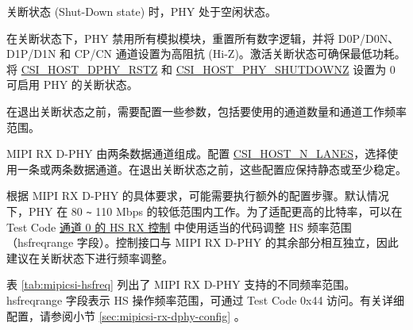 \documentclass[main\_\_CN.tex]{subfiles}
\begin{document}
关断状态 (Shut-Down state) 时，PHY 处于空闲状态。

在关断状态下，PHY 禁用所有模拟模块，重置所有数字逻辑，并将 D0P/D0N、D1P/D1N 和 CP/CN 通道设置为高阻抗 (Hi-Z)。激活关断状态可确保最低功耗。将 \hyperref[fielddesc:CSIHOSTDPHYRSTZ]{CSI\_HOST\_DPHY\_RSTZ} 和 \hyperref[fielddesc:CSIHOSTPHYSHUTDOWNZ]{CSI\_HOST\_PHY\_SHUTDOWNZ} 设置为 0 可启用 PHY 的关断状态。

在退出关断状态之前，需要配置一些参数，包括要使用的通道数量和通道工作频率范围。

MIPI RX D-PHY 由两条数据通道组成。配置 \hyperref[fielddesc:CSIHOSTNLANES]{CSI\_HOST\_N\_LANES}，选择使用一条或两条数据通道。在退出关断状态之前，这些配置应保持静态或至少稳定。

根据 MIPI RX D-PHY 的具体要求，可能需要执行额外的配置步骤。默认情况下，PHY 在 80 \verb+~+ 110 Mbps 的较低范围内工作。为了适配更高的比特率，可以在 Test Code \hyperref[sec:mipicsi-test-code-0x44]{通道 0 的 HS RX 控制} 中使用适当的代码调整 HS 频率范围（hsfreqrange 字段）。控制接口与 MIPI RX D-PHY 的其余部分相互独立，因此建议在关断状态下进行频率调整。

表 \ref{tab:mipicsi-hsfreq} 列出了 MIPI RX D-PHY 支持的不同频率范围。hsfreqrange 字段表示 HS 操作频率范围，可通过 Test Code 0x44 访问。有关详细配置，请参阅小节 \ref{sec:mipicsi-rx-dphy-config} \textit{}。
\end{document}
